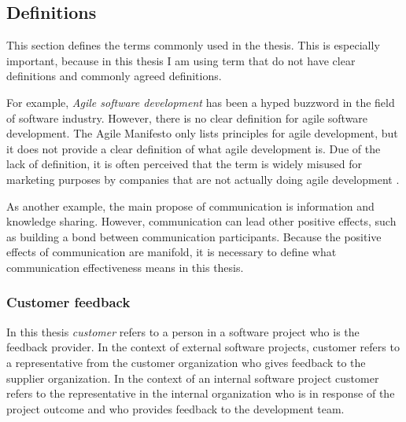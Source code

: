 \documentclass[english,12pt,a4paper,pdftex]{article}
\begin{document}
\subsection{Definitions}

This section defines the terms commonly used in the thesis. This is especially important, because in this thesis I am using term that do not have clear definitions and commonly agreed definitions. 

For example, \emph{Agile software development} has been a hyped buzzword in the field of software industry. However, there is no clear definition for agile software development. The Agile Manifesto \citep{agilemanifesto} only lists principles for agile development, but it does not provide a clear definition of what agile development is. Due of the lack of definition, it is often perceived that the term is widely misused for marketing purposes by companies that are not actually doing agile development \citep{signleton2012}.

As another example, the main propose of communication is information and knowledge sharing. However, communication can lead other positive effects, such as building a bond between communication participants. Because the positive effects of communication are manifold, it is necessary to define what communication effectiveness means in this thesis.

\subsubsection{Customer feedback}

In this thesis \textit{customer} refers to a person in a software project who is the feedback provider. In the context of external software projects, customer refers to a representative from the customer organization who gives feedback to the supplier organization. In the context of an internal software project customer refers to the representative in the internal organization who is in response of the project outcome and who provides feedback to the development team.
\end{document}
